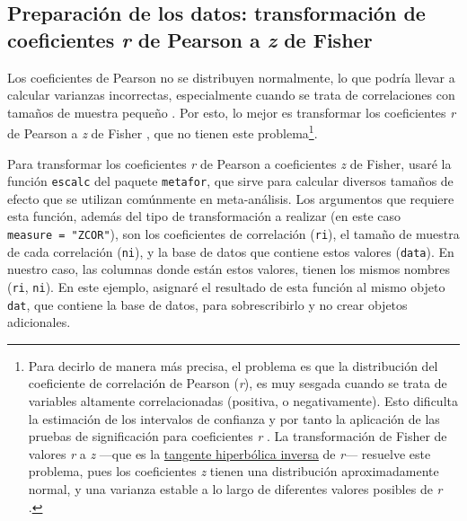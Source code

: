 \documentclass[
  bookmarksnumbered]{article}
\begin{document}
\hypertarget{preparaciuxf3n-de-los-datos-transformaciuxf3n-de-coeficientes-r-de-pearson-a-z-de-fisher}{%
\subsection{\texorpdfstring{Preparación de los datos: transformación de coeficientes \emph{r} de Pearson a \emph{z} de Fisher}{Preparación de los datos: transformación de coeficientes r de Pearson a z de Fisher}}\label{preparaciuxf3n-de-los-datos-transformaciuxf3n-de-coeficientes-r-de-pearson-a-z-de-fisher}}

Los coeficientes de Pearson no se distribuyen normalmente, lo que podría llevar a calcular varianzas incorrectas, especialmente cuando se trata de correlaciones con tamaños de muestra pequeño \autocite{shadishCombiningEstimatesEffect2009}. Por esto, lo mejor es transformar los coeficientes \emph{r} de Pearson a \emph{z} de Fisher \autocite*{fisherFrequencyDistributionValues1915}, que no tienen este problema\footnote{Para decirlo de manera más precisa, el problema es que la distribución del coeficiente de correlación de Pearson (\emph{r}), es muy sesgada cuando se trata de variables altamente correlacionadas (positiva, o negativamente). Esto dificulta la estimación de los intervalos de confianza y por tanto la aplicación de las pruebas de significación para coeficientes \emph{r} \autocite[e.g.,][]{shadishCombiningEstimatesEffect2009}. La transformación de Fisher de valores \emph{r} a \emph{z} ---que es la \href{https://es.wikipedia.org/wiki/Tangente_hiperb\%C3\%B3lica}{tangente hiperbólica inversa} de \emph{r}--- resuelve este problema, pues los coeficientes \emph{z} tienen una distribución aproximadamente normal, y una varianza estable a lo largo de diferentes valores posibles de \emph{r} \autocite[para una demostración en español, ver][]{sanchez-brunoTransformacionFisherPara2005}.}.

Para transformar los coeficientes \emph{r} de Pearson a coeficientes \emph{z} de Fisher, usaré la función \texttt{escalc} del paquete \texttt{metafor}, que sirve para calcular diversos tamaños de efecto que se utilizan comúnmente en meta-análisis. Los argumentos que requiere esta función, además del tipo de transformación a realizar (en este caso \texttt{measure\ =\ "ZCOR"}), son los coeficientes de correlación (\texttt{ri}), el tamaño de muestra de cada correlación (\texttt{ni}), y la base de datos que contiene estos valores (\texttt{data}). En nuestro caso, las columnas donde están estos valores, tienen los mismos nombres (\texttt{ri}, \texttt{ni}). En este ejemplo, asignaré el resultado de esta función al mismo objeto \texttt{dat}, que contiene la base de datos, para sobrescribirlo y no crear objetos adicionales.
\end{document}
